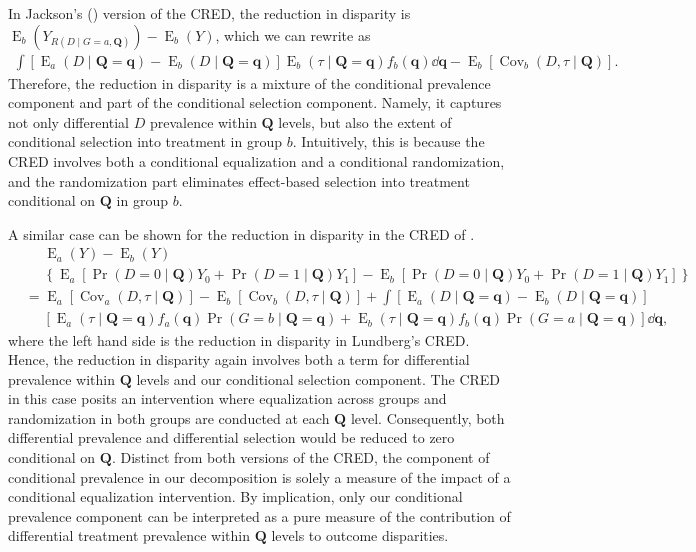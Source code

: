 \documentclass[12pt,a4paper]{article}
\newcommand{\Cov}{\operatorname{Cov}}
\newcommand{\E}{\operatorname{E}}
\def\Q{{\boldsymbol Q}}
\def\q{{\boldsymbol q}}
\DeclareMathOperator{\Pro}{Pr}
\begin{document}
In Jackson's (\citeyear{jackson_meaningful_2021}) version of the CRED, the reduction in disparity is $\E_b(Y_{R(D \mid G=a, \Q)})-\E_b(Y)$, which we can rewrite as 
\begin{gather}
\int  [\E_a(D \mid \Q=\q) - \E_b(D \mid \Q=\q)] \E_b(\tau \mid \Q=\q) f_b(\q) \dd \q - \E_b[\Cov_b(D, \tau \mid \Q)]. 
\end{gather}
Therefore, the reduction in disparity is a mixture of the conditional prevalence component and part of the conditional selection component. Namely, it captures not only differential $D$ prevalence within $\Q$ levels, but also the extent of conditional selection into treatment in group $b$. Intuitively, this is because the CRED involves both a conditional equalization and a conditional randomization, and the randomization part eliminates effect-based selection into treatment conditional on $\Q$ in group $b$. 

A similar case can be shown for the reduction in disparity in the CRED of \citet{lundberg_gap-closing_2022}.
\begin{align}
&\phantom{{}={}} \E_a(Y)-\E_b(Y) \nonumber \\ 
&\phantom{{}={}} \left\lbrace \E_a[\Pro(D=0 \mid \Q) Y_0 + \Pro(D=1 \mid \Q) Y_1] - \E_b[\Pro(D=0 \mid \Q) Y_0 + \Pro(D=1 \mid \Q) Y_1] \right\rbrace \nonumber \\
&= \E_a[\Cov_a(D,\tau \mid \Q)] - \E_b[\Cov_b(D,\tau \mid \Q)] + \int [\E_a(D \mid \Q=\q) - \E_b(D \mid \Q=\q)] \nonumber \\
&\phantom{{}={}} [\E_a(\tau \mid \Q=\q)f_a(\q)\Pro(G=b \mid \Q=\q) + \E_b(\tau \mid \Q=\q)f_b(\q)\Pro(G=a \mid \Q=\q)] \dd \q,
\end{align}
where the left hand side is the reduction in disparity in Lundberg's CRED. Hence, the reduction in disparity again involves both a term for differential prevalence within $\Q$ levels and our conditional selection component. The CRED in this case posits an intervention where equalization across groups and randomization in both groups are conducted at each $\Q$ level. Consequently, both differential prevalence and differential selection would be reduced to zero conditional on $\Q$. Distinct from both versions of the CRED, the component of conditional prevalence in our decomposition is solely a measure of the impact of a conditional equalization intervention. By implication, only our conditional prevalence component can be interpreted as a pure measure of the contribution of differential treatment prevalence within $\Q$ levels to  outcome disparities. 
\end{document}
